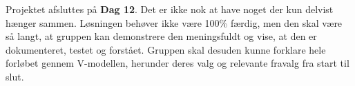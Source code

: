 \documentclass[12pt, a4paper]{article}
\begin{document}
\begin{tcolorbox}[warnbox, title={\faFlagCheckered\quad Afslutning}]
Projektet afsluttes på \textbf{Dag 12}. Det er ikke nok at have noget der
kun delvist hænger sammen. Løsningen behøver ikke være 100\% færdig, men den skal være
så langt, at gruppen kan demonstrere den meningsfuldt og vise, at den er
dokumenteret, testet og forstået. Gruppen skal desuden kunne forklare hele
forløbet gennem V-modellen, herunder deres valg og relevante fravalg fra start
til slut.
\end{tcolorbox}
\end{document}
